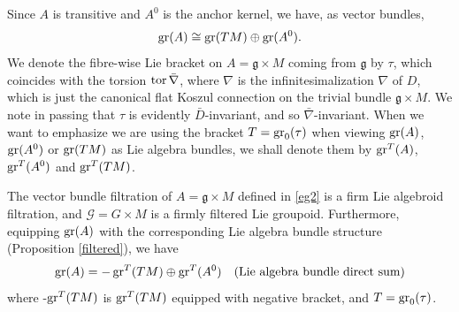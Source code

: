 \documentclass[leqno,12pt]{amsart} %
\begin{document}
Since $A$ is transitive and $A^0$ is the anchor kernel, we have, as vector bundles,
\begin{equation*}
  \operatorname{\operatorname{gr}}(A) \cong \operatorname{\operatorname{gr}}(TM)\oplus \operatorname{\operatorname{gr}}(A^0).
\end{equation*}
We denote the fibre-wise Lie bracket on $A={\mathfrak g} \times M$ coming from
${\mathfrak g} $ by $\tau $, which coincides with the torsion $\operatorname{tor} \bar\nabla $,
where $\nabla $ is the infinitesimalization $\nabla $ of $D$, which is just the canonical
flat Koszul connection on the trivial bundle ${\mathfrak g} \times M$. We note in passing
that $\tau$ is evidently $\bar D$-invariant, and so $\bar\nabla$-invariant. When we want
to emphasize we are using the bracket $T=\operatorname{\operatorname{gr}}_0(\tau)$ when viewing $\operatorname{\operatorname{gr}}(A)$,
$\operatorname{\operatorname{gr}}(A^0)$ or $\operatorname{\operatorname{gr}}(TM)$ as Lie algebra bundles, we shall denote them by
$\operatorname{\operatorname{gr}}^T(A)$, $\operatorname{\operatorname{gr}}^T(A^0)$ and $\operatorname{\operatorname{gr}}^T(TM)$.

\begin{proposition}
  The vector bundle filtration of $A = {\mathfrak g} \times M$ defined in \ref{eg2} is a
  firm Lie algebroid filtration, and ${\mathcal G} = G \times M$ is a firmly filtered Lie
  groupoid. Furthermore, equipping $\operatorname{\operatorname{gr}}(A)$ with the corresponding Lie algebra bundle
  structure (Proposition \ref{filtered}), we have
  \begin{equation*}
    \label{decomposition}
    \operatorname{\operatorname{gr}}(A) = -\operatorname{\operatorname{gr}}^T(TM)\oplus \operatorname{\operatorname{gr}}^T(A^0)\quad
    \text{(Lie algebra bundle direct sum)}
  \end{equation*}
  where -$\operatorname{\operatorname{gr}}^T(TM)$ is $\operatorname{\operatorname{gr}}^T(TM)$ equipped with
  negative bracket, and $T=\operatorname{\operatorname{gr}}_0(\tau)$.
\end{proposition}
\end{document}
